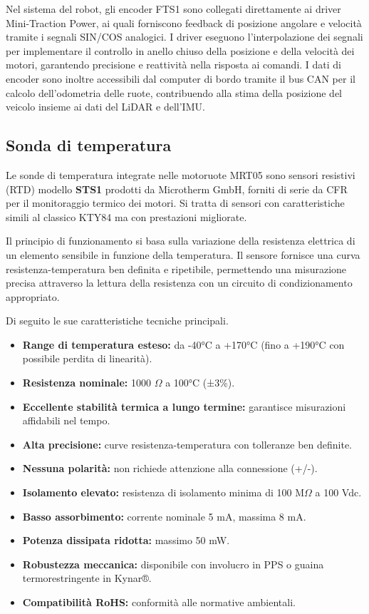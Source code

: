 Nel sistema del robot, gli encoder FTS1 sono collegati direttamente ai driver Mini-Traction Power, ai quali forniscono feedback di posizione angolare e velocità tramite i segnali SIN/COS analogici. I driver eseguono l'interpolazione dei segnali per implementare il controllo in anello chiuso della posizione e della velocità dei motori, garantendo precisione e reattività nella risposta ai comandi. I dati di encoder sono inoltre accessibili dal computer di bordo tramite il bus CAN per il calcolo dell'odometria delle ruote, contribuendo alla stima della posizione del veicolo insieme ai dati del LiDAR e dell'IMU.

\subsection{Sonda di temperatura}

Le sonde di temperatura integrate nelle motoruote MRT05 sono sensori resistivi (RTD) modello \textbf{STS1} prodotti da Microtherm GmbH, forniti di serie da CFR per il monitoraggio termico dei motori. Si tratta di sensori con caratteristiche simili al classico KTY84 ma con prestazioni migliorate.

Il principio di funzionamento si basa sulla variazione della resistenza elettrica di un elemento sensibile in funzione della temperatura. Il sensore fornisce una curva resistenza-temperatura ben definita e ripetibile, permettendo una misurazione precisa attraverso la lettura della resistenza con un circuito di condizionamento appropriato.

Di seguito le sue caratteristiche tecniche principali.
\begin{itemize}
    \item \textbf{Range di temperatura esteso:} da -40°C a +170°C (fino a +190°C con possibile perdita di linearità).
    \item \textbf{Resistenza nominale:} 1000 $\Omega$ a 100°C (±3\%).
    \item \textbf{Eccellente stabilità termica a lungo termine:} garantisce misurazioni affidabili nel tempo.
    \item \textbf{Alta precisione:} curve resistenza-temperatura con tolleranze ben definite.
    \item \textbf{Nessuna polarità:} non richiede attenzione alla connessione (+/-).
    \item \textbf{Isolamento elevato:} resistenza di isolamento minima di 100 M$\Omega$ a 100 Vdc.
    \item \textbf{Basso assorbimento:} corrente nominale 5 mA, massima 8 mA.
    \item \textbf{Potenza dissipata ridotta:} massimo 50 mW.
    \item \textbf{Robustezza meccanica:} disponibile con involucro in PPS o guaina termorestringente in Kynar®.
    \item \textbf{Compatibilità RoHS:} conformità alle normative ambientali.
\end{itemize}

